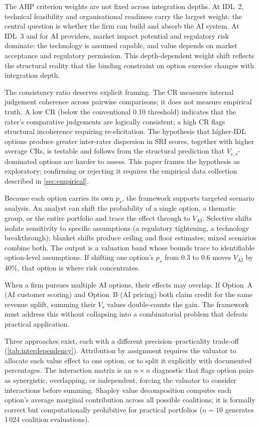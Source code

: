 \documentclass[oneside,10pt]{swissi}
\begin{document}
The AHP criterion weights are not fixed across integration depths. At IDL~2, technical feasibility and organisational readiness carry the largest weight: the central question is whether the firm can build and absorb the AI system. At IDL~3 and for AI providers, market impact potential and regulatory risk dominate: the technology is assumed capable, and value depends on market acceptance and regulatory permission. This depth-dependent weight shift reflects the structural reality that the binding constraint on option exercise changes with integration depth.

The consistency ratio deserves explicit framing. The CR measures internal judgement coherence across pairwise comparisons; it does not measure empirical truth. A low CR (below the conventional 0.10 threshold) indicates that the rater's comparative judgements are logically consistent; a high CR flags structural incoherence requiring re-elicitation. The hypothesis that higher-IDL options produce greater inter-rater dispersion in SRI scores, together with higher average CRs, is testable and follows from the structural prediction that $V_{\mathrm{c},s}$-dominated options are harder to assess. This paper frames the hypothesis as exploratory; confirming or rejecting it requires the empirical data collection described in \cref{sec:empirical}.

Because each option carries its own $p_s$, the framework supports targeted scenario analysis. An analyst can shift the probability of a single option, a thematic group, or the entire portfolio and trace the effect through to $V_{\mathrm{AI}}$. Selective shifts isolate sensitivity to specific assumptions (a regulatory tightening, a technology breakthrough); blanket shifts produce ceiling and floor estimates; mixed scenarios combine both. The output is a valuation band whose bounds trace to identifiable option-level assumptions. If shifting one option's $p_s$ from 0.3 to 0.6 moves $V_{\mathrm{AI}}$ by 40\%, that option is where risk concentrates.

When a firm pursues multiple AI options, their effects may overlap. If Option~A (AI customer scoring) and Option~B (AI pricing) both claim credit for the same revenue uplift, summing their $V_s$ values double-counts the gain. The framework must address this without collapsing into a combinatorial problem that defeats practical application.

Three approaches exist, each with a different precision--practicality trade-off (\cref{tab:interdependency}). Attribution by assignment requires the valuator to allocate each value effect to one option, or to split it explicitly with documented percentages. The interaction matrix is an $n \times n$ diagnostic that flags option pairs as synergistic, overlapping, or independent, forcing the valuator to consider interactions before summing. Shapley value decomposition computes each option's average marginal contribution across all possible coalitions; it is formally correct but computationally prohibitive for practical portfolios ($n = 10$ generates 1\,024 coalition evaluations).
\end{document}
